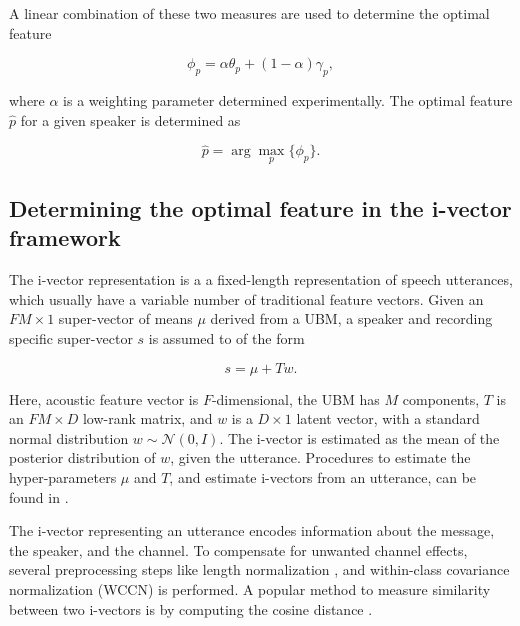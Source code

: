 \documentclass{article}
\begin{document}


A linear combination of these two measures are used to determine the optimal
feature

\begin{equation}
\phi_p = \alpha \theta_p  + (1-\alpha) \gamma_p,
\label{eq:phiFunc}
\end{equation}

where $\alpha$ is a weighting parameter determined experimentally. The optimal
feature $\hat{p}$ for a given speaker is determined as 

\begin{equation}
\hat{p} = \arg\max_p \{\phi_p\}.
\label{eq:ubm_optFeat}
\end{equation}

\subsection{Determining the optimal feature in the i-vector framework}
\label{subsec:ivec_optFeat}

The i-vector representation \cite{dehak_ivector} is a a fixed-length
representation of speech utterances, which usually have a variable number of
traditional feature vectors.  Given an $FM \times 1$ super-vector of means $\mu$
derived from a UBM, a speaker and recording specific super-vector $s$ is assumed to of
the form

\begin{equation}
s = \mu + T w.
\end{equation}

Here, acoustic feature vector is $F$-dimensional, the UBM has $M$ components,
$T$ is an $FM \times D$ low-rank matrix, and $w$ is a $D \times 1$ latent
vector, with a standard normal distribution $w \sim \mathcal{N}(0,I)$. The
i-vector is estimated as the mean of the posterior distribution of $w$, given
the utterance. Procedures to estimate the hyper-parameters $\mu$ and $T$, and 
estimate i-vectors from an utterance, can be found in \cite{dehak_ivector}.

The i-vector representing an utterance encodes information about the message,
the speaker, and the channel. To compensate for unwanted channel effects,
several preprocessing steps like length normalization \cite{garcia_lengthNorm},
and within-class covariance normalization (WCCN) \cite{wccn} is performed. A
popular method to measure similarity between two i-vectors is by computing the
cosine distance \cite{dehak_ivector}.
\end{document}
